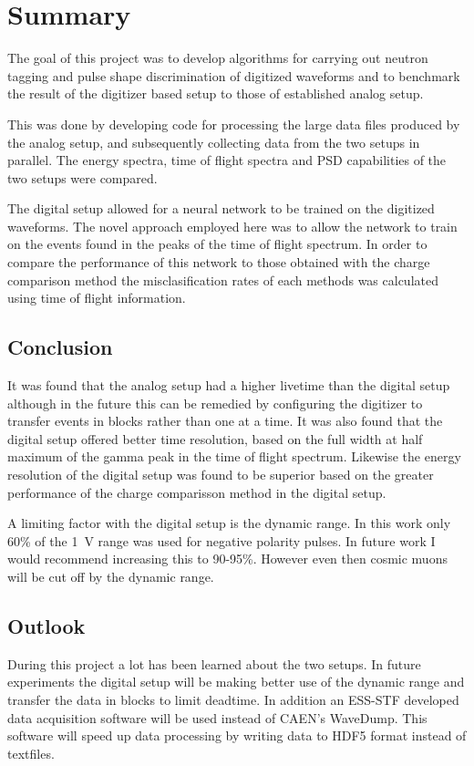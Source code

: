 \documentclass[main.tex]{subfiles}
\begin{document}
\chapter{Summary}
The goal of this project was to develop algorithms for carrying out neutron tagging and pulse shape discrimination of digitized waveforms and to benchmark the result of the digitizer based setup to those of established analog setup.

This was done by developing code for processing the large data files produced by the analog setup, and subsequently collecting data from the two setups in parallel. The energy spectra, time of flight spectra and PSD capabilities of the two setups were compared.

The digital setup allowed for a neural network to be trained on the digitized waveforms. The novel approach employed here was to allow the network to train on the events found in the peaks of the time of flight spectrum. In order to compare the performance of this network to those obtained with the charge comparison method the misclasification rates of each methods was calculated using time of flight information.



\section{Conclusion}
It was found that the analog setup had a higher livetime than the digital setup although in the future this can be remedied by configuring the digitizer to transfer events in blocks rather than one at a time. It was also found that the digital setup offered better time resolution, based on the full width at half maximum of the gamma peak in the time of flight spectrum. Likewise the energy resolution of the digital setup was found to be superior based on the greater performance of the charge comparisson method in the digital setup. 

A limiting factor with the digital setup is the dynamic range. In this work only 60\% of the \SI{1}{V} range was used for negative polarity pulses. In future work I would recommend increasing this to 90-95\%. However even then cosmic muons will be cut off by the dynamic range. 

\section{Outlook}
During this project a lot has been learned about the two setups. In future experiments the digital setup will be making better use of the dynamic range and transfer the data in blocks to limit deadtime. In addition an ESS-STF developed data acquisition software will be used instead of CAEN's WaveDump. This software will speed up data processing by writing data to HDF5 format instead of textfiles. 
\end{document}
